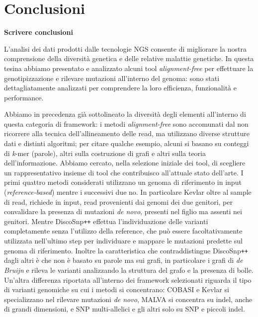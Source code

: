 \documentclass[../main.tex]{subfiles}
\begin{document}
\section{Conclusioni}

\textbf{Scrivere conclusioni}

L'analisi dei dati prodotti dalle tecnologie NGS consente di migliorare la nostra comprensione della diversità genetica e delle relative malattie genetiche. In questa tesina abbiamo presentato e analizzato alcuni tool \textit{alignment-free} per effettuare la genotipizzazione e rilevare mutazioni all'interno del genoma: sono stati dettagliatamente analizzati per comprendere la loro efficienza, funzionalità e performance. 

Abbiamo in precedenza già sottolineato la diversità degli elementi all'interno di questa categoria di framework: i metodi \textit{alignment-free} sono accomunati dal non ricorrere alla tecnica dell'allineamento delle read, ma utilizzano diverse strutture dati e distinti algoritmi; per citare qualche esempio, alcuni si basano su conteggi di \textit{k}-mer (parole), altri sulla costruzione di grafi e altri sulla teoria dell'informazione. Abbiamo cercato, nella selezione iniziale dei tool, di scegliere un rappresentativo insieme di tool che contribuisco all'attuale stato dell'arte. I primi quattro metodi considerati utilizzano un genoma di riferimento in input (\textit{reference-based}) mentre i successivi due no. In particolare Kevlar \cite{standage2019kevlar} oltre al sample di read, richiede in input, read provenienti dai genomi dei due genitori, per convalidare la presenza di mutazioni \textit{de novo}, presenti nel figlio ma assenti nei genitori. Mentre DiscoSnp\texttt{++} \cite{peterlongo2017discosnp++} effettua l'individuazione delle varianti completamente senza l'utilizzo della reference, che può essere facoltativamente utilizzata nell'ultimo step per individuare e mappare le mutazioni predette sul genoma di riferimento. Inoltre la caratteristica che contraddistingue DiscoSnp\texttt{++} dagli altri è che non è basato su parole ma sui grafi, in particolare i grafi di \textit{de Bruijn} e rileva le varianti analizzando la struttura del grafo e la presenza di bolle. Un'altra differenza riportata all'interno dei framework selezionati riguarda il tipo di varianti genomiche su cui i metodi si concentrano: COBASI \cite{gomez-romero2018cobasi} e  Kevlar si specializzano nel rilevare mutazioni \textit{de novo}, MALVA  \cite{bernardini2019malva} si concentra su indel, anche di grandi dimensioni, e SNP multi-allelici e gli altri solo su SNP e piccoli indel.
\end{document}
